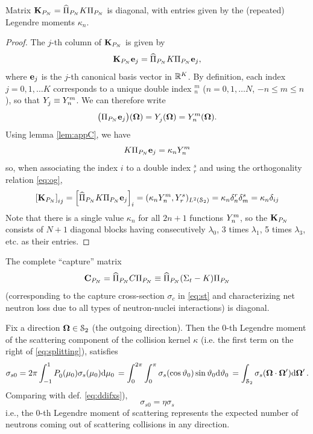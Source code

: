 \begin{corollary}
	Matrix $\mat{K}_{P_N} = \PihPN K \PiPN$ is diagonal, with entries given by the (repeated) Legendre moments $\kappa_n$.
\end{corollary}
\begin{proof}
	The $j$-th column of $\mat{K}_{P_N}$ is given by
	$$
		\mat{K}_{P_N}\mat{e}_j = \PihPN K \PiPN \mat{e}_j,
	$$
	where $\mat{e}_j$ is the $j$-th canonical basis vector in $\R[K]$. By definition, each index \mbox{$j = 0,1,\ldots K$}
	corresponds to a unique double index ${}_n^m$ ($n = 0,1,\ldots N$, $-n \leq m \leq n$), so that $\Y{j}{} \equiv
	\Y{n}{m}$.
	We can therefore write 
	$$
		\bigl(\PiPN \mat{e}_j\bigr)(\bomega) = \Y{j}{}(\bomega) = Y_n^m(\bomega).
	$$
	Using lemma \ref{lem:appC}, we have 
	$$
		K \PiPN \mat{e}_j = \kappa_n \Y{n}{m}
	$$
	so, when associating the index $i$ to a double index ${}_r^s$ and using the orthogonality relation \eqref{eq:og},
	$$
	\left[\mat{K}_{P_N}\right]_{ij} = \left[\PihPN K \PiPN \mat{e}_j\right]_i = (\kappa_n \Y{n}{m},
		\Y{r}{s})_{\Lp[2](\Sphere)} = \kappa_n\delta_{n}^{r}\delta_{m}^{s} = \kappa_n\kron{i}{j}
	$$
	Note that there is a single value $\kappa_n$ for all $2n + 1$ functions  $\Y{n}{m}$, so the $\mat{K}_{P_N}$ consists of
	$N+1$ diagonal blocks having consecutively $\lambda_0$, 3 times $\lambda_1$, 5 times $\lambda_3$, etc.  as their
	entries.
\end{proof}
\begin{corollary}
The complete ``capture'' matrix 
$$
	\mat{C}_{P_N} = \PihPN C \PiPN \equiv \PihPN (\Sigma_t - K) \PiPN 
$$
(corresponding to the capture cross-section $\sigma_c$ in \eqref{eq:st} and characterizing net neutron loss due to
all types of neutron-nuclei interactions) is diagonal.
\end{corollary}
\vspace*{1em}
\begin{remark}\label{rem:app:c}
	Fix a direction $\bomega\in\Sphere$ (the outgoing direction). Then the $0$-th Legendre moment of the scattering
	component of the collision kernel $\kappa$ (i.e. the first term on the right of \eqref{eq:splitting}), satisfies 
	$$
		\sigma_{s0} = 2\pi \muint[_0]{\P{0}{}(\mu_0)\sigma_s(\mu_0)} = \int_{0}^{2\pi} \int_{0}^{\pi}
		\sigma_s(\cos \polar_0) \sin \polar_0\d{\polar_0} = 
		\int_{\Sphere} \sigma_s(\bomega\cdot\bomega') \d{\bomega'}.
	$$
	Comparing with def. \eqref{eq:ddifxs}), 
	$$
		\sigma_{s0} = \eta\sigma_s
	$$
	i.e., the $0$-th Legendre moment of scattering represents the expected number of neutrons coming out of 
	scattering collisions in any direction.
\end{remark} 


